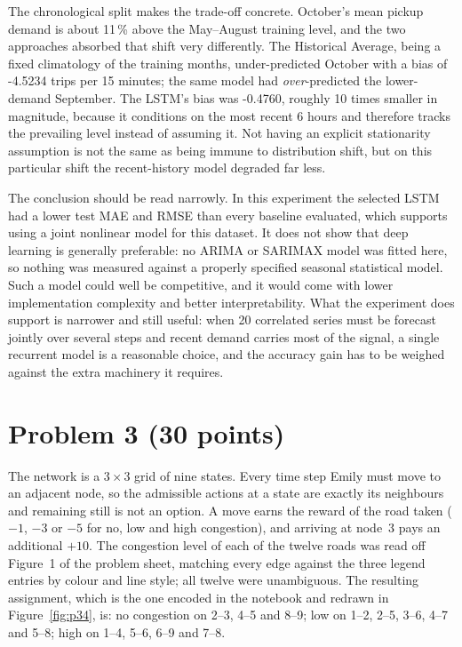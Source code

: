 \documentclass[11pt,a4paper]{article}
\begin{document}
The chronological split makes the trade-off concrete. October's mean pickup demand is
about 11\,\%
above the May--August training level, and the two approaches absorbed that shift very
differently. The Historical Average, being a fixed climatology of the training
months, under-predicted October with a bias of
-4.5234 trips per 15 minutes; the same model had
\emph{over}-predicted the lower-demand September. The LSTM's bias was
-0.4760, roughly
10 times smaller in
magnitude, because it conditions on the most recent
6 hours and therefore tracks the prevailing level instead
of assuming it. Not having an explicit stationarity
assumption is not the same as being immune to distribution shift, but on this
particular shift the recent-history model degraded far less.

The conclusion should be read narrowly. In this experiment the selected LSTM had a
lower test MAE and RMSE than every baseline evaluated, which supports using a joint
nonlinear model for this dataset. It does not show that deep learning is generally
preferable: no ARIMA or SARIMAX model was fitted here, so nothing was measured
against a properly specified seasonal statistical model. Such a model could well be
competitive, and it would come with lower implementation complexity and better
interpretability. What the experiment does support is narrower and still useful:
when 20 correlated series must be forecast jointly over several steps and recent
demand carries most of the signal, a single recurrent model is a reasonable choice,
and the accuracy gain has to be weighed against the extra machinery it requires.

\section{Problem 3 (30 points)}

The network is a $3\times3$ grid of nine states. Every time step Emily must move to
an adjacent node, so the admissible actions at a state are exactly its neighbours and
remaining still is not an option. A move earns the reward of the road taken
($-1$, $-3$ or $-5$ for no, low and high congestion), and arriving at node~3 pays an
additional $+10$. The congestion level of each of the twelve roads was read off
Figure~1 of the problem sheet, matching every edge against the three legend entries
by colour and line style; all twelve were unambiguous. The resulting assignment,
which is the one encoded in the notebook and redrawn in Figure~\ref{fig:p34}, is:
no congestion on 2--3, 4--5 and 8--9; low on 1--2, 2--5, 3--6, 4--7 and 5--8; high
on 1--4, 5--6, 6--9 and 7--8.
\end{document}
